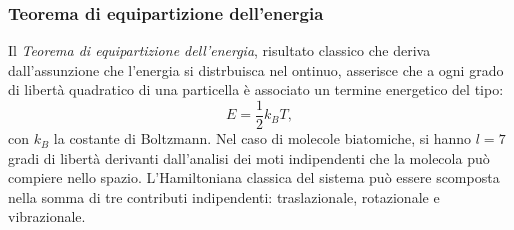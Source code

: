 \documentclass[a4paper,11pt]{report}
\begin{document}
\subsubsection{Teorema di equipartizione dell'energia}
Il \textit{Teorema di equipartizione dell'energia}, risultato classico che deriva dall'assunzione che l'energia si distrbuisca nel ontinuo, asserisce che a ogni grado di libertà quadratico di una particella è associato un termine energetico del tipo:
\begin{equation}
E = \frac{1}{2}k_BT,
\end{equation}
con $k_B$ la costante di Boltzmann. Nel caso di molecole biatomiche, si hanno $l = 7$ gradi di libertà derivanti dall'analisi dei moti indipendenti che la molecola può compiere nello spazio.
L'Hamiltoniana classica del sistema può essere scomposta nella somma di tre contributi indipendenti: traslazionale, rotazionale e vibrazionale.
\end{document}
